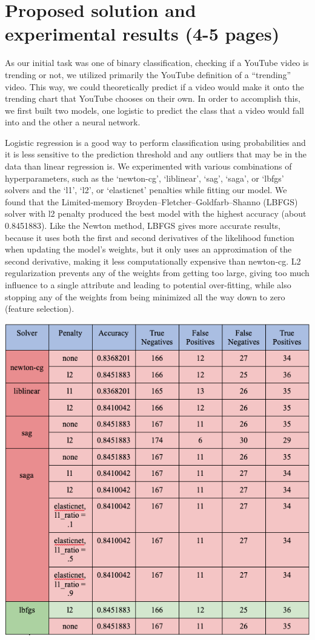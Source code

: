 \documentclass{article}
\begin{document}
\section*{Proposed solution and experimental results (4-5 pages)}
\quad As our initial task was one of binary classification, checking if a YouTube video is trending or not, we utilized primarily the YouTube definition of a “trending” video. This way, we could theoretically predict if a video would make it onto the trending chart that YouTube chooses on their own. In order to accomplish this, we first built two models, one logistic to predict the class that a video would fall into and the other a neural network.
\par Logistic regression is a good way to perform classification using probabilities and it is less sensitive to the prediction threshold and any outliers that may be in the data than linear regression is. We experimented with various combinations of hyperparameters, such as the ‘newton-cg’, ‘liblinear’, ‘sag’, ‘saga’, or ‘lbfgs’ solvers and the ‘l1’, ‘l2’, or ‘elasticnet’ penalties while fitting our model.  We found that the Limited-memory Broyden–Fletcher–Goldfarb–Shanno (LBFGS) solver with l2 penalty produced the best model with the highest accuracy (about 0.8451883).  Like the Newton method, LBFGS gives more accurate results, because it uses both the first and second derivatives of the likelihood function when updating the model’s weights, but it only uses an approximation of the second derivative, making it less computationally expensive than newton-cg.  L2 regularization prevents any of the weights from getting too large, giving too much influence to a single attribute and leading to potential over-fitting, while also stopping any of the weights from being minimized all the way down to zero (feature selection).

\includegraphics[scale=.5]{chart1.png}\\
\end{document}
